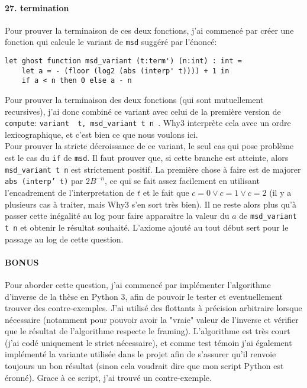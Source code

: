 \documentclass[a4paper]{article}%
\begin{document}
	\paragraph{27. termination} Pour prouver la terminaison de ces deux fonctions, j'ai commencé par créer une fonction qui calcule
	le variant de \texttt{msd} suggéré par l'énoncé:
	\begin{verbatim}
let ghost function msd_variant (t:term') (n:int) : int =
	let a = - (floor (log2 (abs (interp' t)))) + 1 in
	if a < n then 0 else a - n
	\end{verbatim}
	Pour prouver la terminaison des deux fonctions (qui sont mutuellement recursives),
	j'ai donc combiné ce variant avec celui de la première version de \texttt{compute}:
	\texttt{variant { t, msd_variant t n }}.
	Why3 interprète cela avec un ordre lexicographique, et c'est bien ce que nous voulons ici.\\

	Pour prouver la stricte décroissance de ce variant, le seul cas qui pose problème est le cas du \texttt{if}
	de \texttt{msd}. Il faut prouver que, si cette branche est atteinte, alors \texttt{msd_variant t n}
	est strictement positif. La première chose à faire est de majorer \texttt{abs (interp' t)} par $2B^{-n}$,
	ce qui se fait assez facilement en utilisant l'encadrement de l'interpretation de $t$ et le fait que $c=0 \vee c=1 \vee c=2$
	(il y a plusieurs cas à traiter, mais Why3 s'en sort très bien). Il ne reste alors plus qu'à passer cette inégalité au log
	pour faire apparaitre la valeur du $a$ de \texttt{msd_variant t n} et obtenir le résultat souhaité.
	L'axiome ajouté au tout début sert pour le passage au log de cette question.

	\paragraph{BONUS} Pour aborder cette question, j'ai commencé par implémenter l'algorithme d'inverse de la thèse en Python 3,
	afin de pouvoir le tester et eventuellement trouver des contre-exemples.
	J'ai utilisé des flottants à précision arbitraire lorsque nécessaire (notamment pour pouvoir avoir la "vraie" valeur de l'inverse
	et vérifier que le résultat de l'algorithme respecte le framing). L'algorithme est très court (j'ai codé uniquement le strict nécessaire),
	et comme test témoin j'ai également implémenté la variante utilisée dans le projet afin de s'assurer qu'il renvoie toujours
	un bon résultat (sinon cela voudrait dire que mon script Python est éronné). Grace à ce script, j'ai trouvé un contre-exemple.\\
\end{document}
